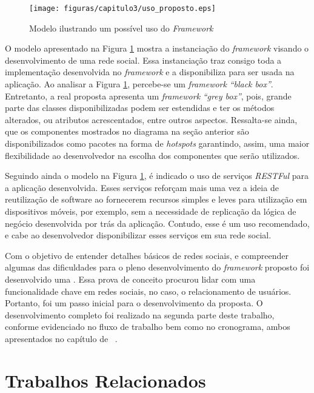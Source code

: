 \begin{figure}[!h]
	\centering
	\texttt{[image: figuras/capitulo3/uso\_proposto.eps]}
	\caption{Modelo ilustrando um possível uso do \textit{Framework}}
	\label{uso_proposto}
\end{figure}

O modelo apresentado na Figura \ref{uso_proposto} mostra a instanciação do \textit{framework}  visando o desenvolvimento de uma rede social. Essa instanciação traz consigo toda a implementação desenvolvida no \textit{framework} e a disponibiliza para ser usada na aplicação. Ao analisar a Figura \ref{uso_proposto}, percebe-se um \textit{framework} \textit{``black box''}. Entretanto, a real proposta apresenta um \textit{framework} \textit{``grey box''}, pois, grande parte das classes disponibilizadas podem ser estendidas e ter os métodos alterados, ou atributos acrescentados, entre outros aspectos. Ressalta-se ainda, que os componentes mostrados no diagrama na seção anterior são disponibilizados como pacotes na forma de \textit{hotspots} \cite{Franca:2001} garantindo, assim, uma maior flexibilidade ao desenvolvedor na escolha dos componentes que serão utilizados.

Seguindo ainda o modelo na Figura \ref{uso_proposto}, é indicado o uso de serviços \textit{RESTFul} para a aplicação desenvolvida. Esses serviços reforçam mais uma vez a ideia de reutilização de software ao fornecerem recursos simples e leves para utilização em dispositivos móveis, por exemplo, sem a necessidade de replicação da lógica de negócio desenvolvida por trás da aplicação. Contudo, esse é um uso recomendado, e cabe ao desenvolvedor disponibilizar esses serviços em sua rede social.

Com o objetivo de entender detalhes básicos de redes sociais, e compreender algumas das dificuldades para o pleno desenvolvimento do \textit{framework} proposto foi desenvolvido uma . Essa prova de conceito procurou lidar com uma funcionalidade chave em redes sociais, no caso, o relacionamento de usuários. Portanto, foi um passo inicial para o desenvolvimento da proposta. O desenvolvimento completo foi realizado na segunda parte deste trabalho, conforme evidenciado no fluxo de trabalho bem como no cronograma, ambos apresentados no capítulo de ~.

\section{Trabalhos Relacionados}

